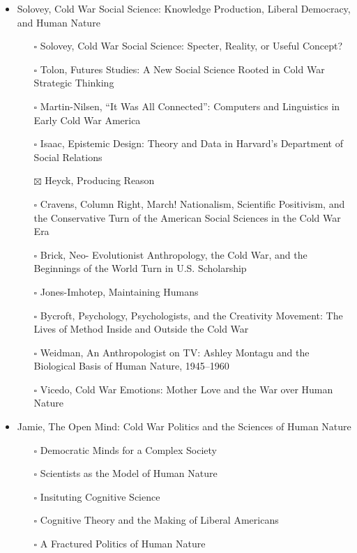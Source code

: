 \documentclass[paper=B6,portrait,twoside=true,twocolumn=false,headinclude=true,footinclude=false,fontsize=12,BCOR=10mm,DIV=calc,pagesize=auto,titlepage=firstiscover,mpinclude=false,headings=normal,headings=twolinechapter,open=right,toc=graduated,chapterprefix=false,numbers=endperiod,parskip=half+]{scrbook}
\theoremstyle{definition}
\begin{document}
\begin{itemize}
\item\relax [1/11] Solovey, Cold War Social Science: Knowledge Production, Liberal
Democracy, and Human Nature
\begin{itemize}
\item[{$\square$}] Solovey, Cold War Social Science: Specter, Reality, or Useful Concept?
\item[{$\square$}] Tolon, Futures Studies: A New Social Science Rooted in Cold War Strategic Thinking
\item[{$\square$}] Martin-Nilsen, “It Was All Connected”: Computers and Linguistics in Early Cold War America
\item[{$\square$}] Isaac, Epistemic Design: Theory and Data in Harvard’s Department of Social Relations
\item[{$\boxtimes$}] Heyck, Producing Reason
\item[{$\square$}] Cravens, Column Right, March! Nationalism, Scientific Positivism, and the Conservative Turn of the American Social Sciences in the Cold War Era
\item[{$\square$}] Brick, Neo- Evolutionist Anthropology, the Cold War, and the Beginnings of the World Turn in U.S. Scholarship
\item[{$\square$}] Jones-Imhotep, Maintaining Humans
\item[{$\square$}] Bycroft, Psychology, Psychologists, and the Creativity Movement: The Lives of Method Inside and Outside the Cold War
\item[{$\square$}] Weidman, An Anthropologist on TV: Ashley Montagu and the Biological
Basis of Human Nature, 1945–1960
\item[{$\square$}] Vicedo, Cold War Emotions: Mother Love and the War over Human Nature
\end{itemize}
\item\relax [0/5] Jamie, The Open Mind: Cold War Politics and the Sciences of Human
Nature
\begin{itemize}
\item[{$\square$}] Democratic Minds for a Complex Society
\item[{$\square$}] Scientists as the Model of Human Nature
\item[{$\square$}] Insituting Cognitive Science
\item[{$\square$}] Cognitive Theory and the Making of Liberal Americans
\item[{$\square$}] A Fractured Politics of Human Nature
\end{itemize}

\end{itemize}
\end{document}
